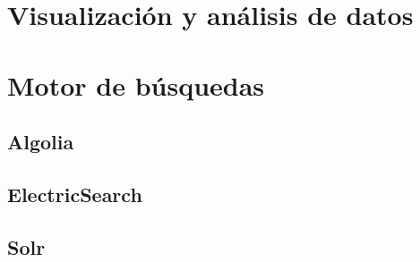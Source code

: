 \section{Visualización y análisis de datos}


\section{Motor de búsquedas}

\subsection{Algolia}


\subsection{ElectricSearch}


\subsection{Solr}